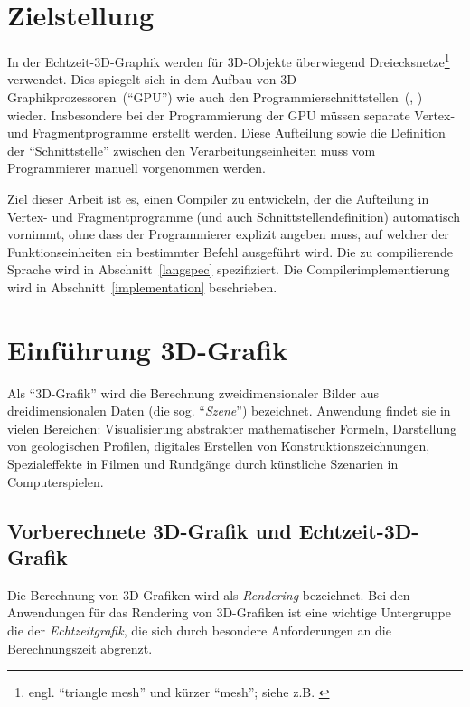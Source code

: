\documentclass[twoside,a4paper,fleqn,12pt]{article}
\begin{document}
\section{Zielstellung}

In der Echtzeit-3D-Graphik werden für 3D-Objekte überwiegend Dreiecksnetze\footnote{engl. ``triangle mesh'' und kürzer ``mesh''; siehe z.B. \cite{watt_de}}
verwendet. Dies spiegelt sich in dem Aufbau von 3D-Graphikprozessoren~("`GPU"') wie auch
den Programmierschnittstellen~(\cite{glspec4}, \cite{dx10}) wieder. Insbesondere bei der Programmierung der GPU müssen
separate Vertex- und Fragmentprogramme %
erstellt werden. Diese Aufteilung sowie die Definition der "`Schnittstelle"' zwischen den Verarbeitungseinheiten muss vom Programmierer manuell vorgenommen werden.

Ziel dieser Arbeit ist es, einen Compiler zu entwickeln, der die Aufteilung in Vertex- und Fragmentprogramme (und auch Schnittstellendefinition)
automatisch vornimmt,
ohne dass der Programmierer explizit angeben muss, auf welcher der Funktionseinheiten ein bestimmter Befehl ausgeführt wird.
Die zu compilierende Sprache wird in Abschnitt~\ref{langspec} spezifiziert. Die Compilerimplementierung wird in Abschnitt~\ref{implementation}
beschrieben.


\section{Einführung 3D-Grafik}

Als "`3D-Grafik"' wird die Berechnung zweidimensionaler Bilder aus dreidimensionalen Daten (die sog. "`\emph{Szene}"')
 bezeichnet.
Anwendung findet sie in vielen Bereichen: Visualisierung abstrakter mathematischer Formeln, Darstellung
von geologischen Profilen, digitales Erstellen von Konstruktionszeichnungen, Spezialeffekte in Filmen und
Rundgänge durch künstliche Szenarien in Computerspielen. 

\subsection{Vorberechnete 3D-Grafik und Echtzeit-3D-Grafik}

Die Berechnung von 3D-Grafiken wird als \emph{Rendering} bezeichnet. Bei den Anwendungen für das Rendering
von 3D-Grafiken ist eine wichtige Untergruppe die der \emph{Echtzeitgrafik}, die sich durch besondere Anforderungen
an die Berechnungszeit abgrenzt.
\end{document}
